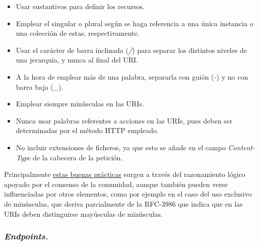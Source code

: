 \begin{itemize}
    \item Usar sustantivos para definir los recursos.
    \item Emplear el singular o plural según se haga referencia a una única instancia o una colección de estas, respectivamente.
    \item Usar el carácter de barra inclinada (\textit{/}) para separar los distintos niveles de una jerarquía, y nunca al final del URI.
    \item A la hora de emplear más de una palabra, separarla con guión (\textit{-}) y no con barra baja (\textit{\_}).
    \item Emplear siempre minúsculas en las URIs.
    \item Nunca usar palabras referentes a acciones en las URIs, pues deben ser determinadas por el método HTTP empleado.
    \item No incluir extensiones de ficheros, ya que esto se añade en el campo \textit{Content-Type} de la cabecera de la petición.
\end{itemize}

Principalmente \href{https://restfulapi.net/resource-naming/}{estas buenas prácticas} surgen a través del razonamiento lógico apoyado por el consenso de la comunidad, aunque también pueden verse influenciadas por otros elementos, como por ejemplo en el caso del uso exclusivo de minúsculas, que deriva parcialmente de la RFC-3986\cite{URIRFC} que indica que en las URIs deben distinguirse mayúsculas de minúsculas.

\subsubsection{\textit{Endpoints.}}


